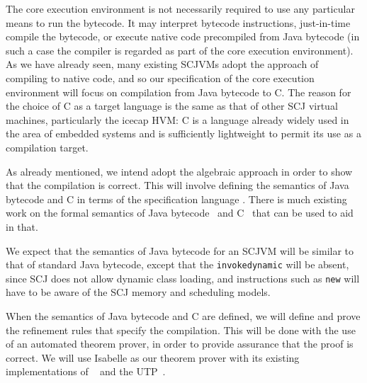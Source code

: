 \documentclass[a4paper,10pt]{report}
\begin{document}
The core execution environment is not necessarily required to use any particular
means to run the bytecode.  It may interpret bytecode instructions, just-in-time
compile the bytecode, or execute native code precompiled from Java bytecode (in
such a case the compiler is regarded as part of the core execution environment).
As we have already seen, many existing SCJVMs adopt the approach of compiling to
native code, and so our specification of the core execution environment will
focus on compilation from Java bytecode to C. The reason for the choice of C as
a target language is the same as that of other SCJ virtual machines,
particularly the icecap HVM: C is a language already widely used in the area of
embedded systems and is sufficiently lightweight to permit its use as a
compilation target.

As already mentioned, we intend adopt the algebraic approach in order to show
that the compilation is correct.  This will involve defining the semantics of
Java bytecode and C in terms of the specification language \Circus{}.  There is
much existing work on the formal semantics of Java bytecode~\cite{bertelsen2000,
  jones1998, stark2001, alves1999a, bogdanas2015, lochbihler2012a} and
C~\cite{campbell2012, ellison2012, krebbers2014} that can be used to aid in
that.

We expect that the semantics of Java bytecode for an SCJVM will be similar to
that of standard Java bytecode, except that the \texttt{invokedynamic} will be
absent, since SCJ does not allow dynamic class loading, and instructions such as
\texttt{new} will have to be aware of the SCJ memory and scheduling models.

When the semantics of Java bytecode and C are defined, we will define and prove
the refinement rules that specify the compilation.  This will be done with the
use of an automated theorem prover, in order to provide assurance that the proof
is correct. We will use Isabelle as our theorem prover with its existing
implementations of \Circus{}~\cite{joshi2012} and the UTP~\cite{foster2015}.
\end{document}
